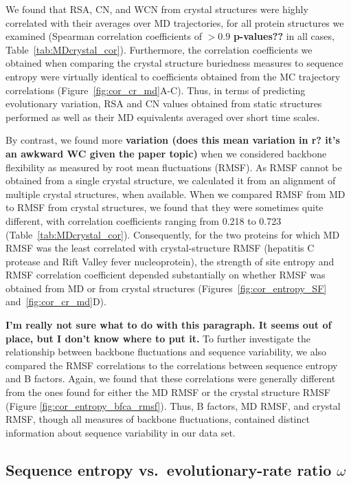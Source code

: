 \documentclass[smallextended]{svjour3}
\begin{document}
We found that RSA, CN, and WCN from crystal structures were highly correlated with their averages over MD trajectories, for all protein structures we examined (Spearman correlation coefficients of $>0.9$ \textbf{p-values??} in all cases, Table~\ref{tab:MDcrystal_cor}). Furthermore, the correlation coefficients we obtained when comparing the crystal structure buriedness measures to sequence entropy were virtually identical to coefficients obtained from the MC trajectory correlations (Figure~\ref{fig:cor_cr_md}A-C). Thus, in terms of predicting evolutionary variation, RSA and CN values obtained from static structures performed as well as their MD equivalents averaged over short time scales.

By contrast, we found more \textbf{variation (does this mean variation in r? it's an awkward WC given the paper topic)} when we considered backbone flexibility as measured by root mean fluctuations (RMSF). As RMSF cannot be obtained from a single crystal structure, we calculated it from an alignment of multiple crystal structures, when available. When we compared RMSF from MD to RMSF from crystal structures, we found that they were sometimes quite different, with correlation coefficients ranging from 0.218 to 0.723 (Table~\ref{tab:MDcrystal_cor}). Consequently, for the two proteins for which MD RMSF was the least correlated with crystal-structure RMSF (hepatitis C protease and Rift Valley fever nucleoprotein), the strength of site entropy and RMSF correlation coefficient depended substantially on whether RMSF was obtained from MD or from crystal structures (Figures~\ref{fig:cor_entropy_SF} and~\ref{fig:cor_cr_md}D).

\textbf{I'm really not sure what to do with this paragraph. It seems out of place, but I don't know where to put it.}
To further investigate the relationship between backbone fluctuations and sequence variability, we also compared the RMSF correlations to the correlations between sequence entropy and B factors. Again, we found that these correlations were generally different from the ones found for either the MD RMSF or the crystal structure RMSF (Figure \ref{fig:cor_entropy_bfca_rmsf}). Thus, B factors, MD RMSF, and crystal RMSF, though all measures of backbone fluctuations, contained distinct information about sequence variability in our data set.

\subsection*{Sequence entropy vs.\ evolutionary-rate ratio $\omega$}
\end{document}

